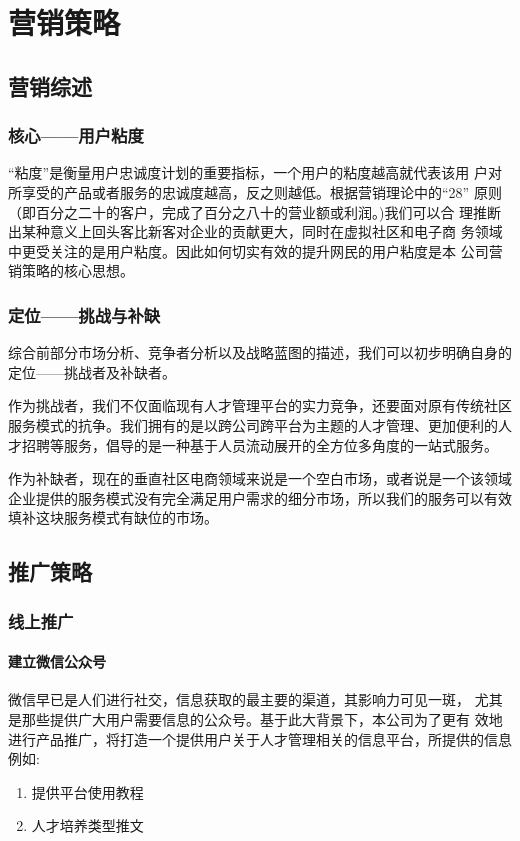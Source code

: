 \documentclass[UTF8]{ctexart}
\begin{document}
\section{营销策略}
\subsection{营销综述}
\subsubsection{核心——用户粘度}
“粘度”是衡量用户忠诚度计划的重要指标，一个用户的粘度越高就代表该用 户对所享受的产品或者服务的忠诚度越高，反之则越低。根据营销理论中的“28” 原则（即百分之二十的客户，完成了百分之八十的营业额或利润。)我们可以合 理推断出某种意义上回头客比新客对企业的贡献更大，同时在虚拟社区和电子商 务领域中更受关注的是用户粘度。因此如何切实有效的提升网民的用户粘度是本 公司营销策略的核心思想。
\subsubsection{定位——挑战与补缺}
综合前部分市场分析、竞争者分析以及战略蓝图的描述，我们可以初步明确自身的定位——挑战者及补缺者。

作为挑战者，我们不仅面临现有人才管理平台的实力竞争，还要面对原有传统社区服务模式的抗争。我们拥有的是以跨公司跨平台为主题的人才管理、更加便利的人才招聘等服务，倡导的是一种基于人员流动展开的全方位多角度的一站式服务。

作为补缺者，现在的垂直社区电商领域来说是一个空白市场，或者说是一个该领域企业提供的服务模式没有完全满足用户需求的细分市场，所以我们的服务可以有效填补这块服务模式有缺位的市场。
\subsection{推广策略}
\subsubsection{线上推广}
\paragraph{建立微信公众号}


微信早已是人们进行社交，信息获取的最主要的渠道，其影响力可见一斑， 尤其是那些提供广大用户需要信息的公众号。基于此大背景下，本公司为了更有 效地进行产品推广，将打造一个提供用户关于人才管理相关的信息平台，所提供的信息例如:
\begin{enumerate}[1)]
	\item 提供平台使用教程
	\item 人才培养类型推文
\end{enumerate}
\end{document}
